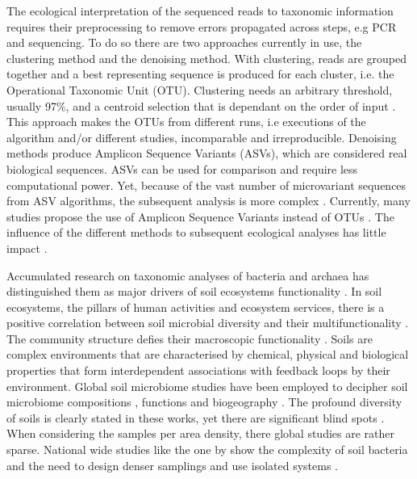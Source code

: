 The ecological interpretation of the sequenced reads to taxonomic information
requires their preprocessing to remove errors propagated across steps, e.g PCR and sequencing.
To do so there are two approaches currently in use, 
the clustering method and the denoising method. With clustering, reads are 
grouped together and a best representing sequence is produced for each 
cluster, i.e. the Operational Taxonomic Unit (OTU). 
Clustering needs an arbitrary threshold, usually 97\%, and a centroid selection
that is dependant on the order of input \parencite{zafeiropoulos2020pema}. 
This approach makes the OTUs 
from different runs, i.e executions of the algorithm and/or different studies,
incomparable and irreproducible.
Denoising methods produce Amplicon Sequence Variants (ASVs),
which are considered real biological sequences. 
ASVs can be used for comparison and require less computational power. 
Yet, because of the vast number of microvariant sequences from ASV algorithms,
the subsequent analysis is more complex \parencite{Glassman2018}.
Currently, many studies propose the use of Amplicon Sequence Variants
instead of OTUs \parencite{Callahan2017}.
The influence of the different methods to subsequent ecological analyses has
little impact \parencite{Glassman2018}.

Accumulated research on taxonomic analyses of bacteria and archaea has
distinguished them as major drivers of soil ecosystems functionality \parencite{Delgado-Baquerizo-atlas}.
In soil ecosystems, the pillars of human activities and ecosystem services, 
there is a positive correlation between soil microbial diversity and their multifunctionality \parencite{Delgado-Baquerizo2020}.
The community structure defies their macroscopic functionality \parencite{Bahram2018}.
Soils are complex environments that are characterised by chemical, physical and biological properties
that form interdependent associations with feedback loops by their environment. 
Global soil microbiome studies have been employed to decipher soil microbiome
compositions \parencite{thompson2017a-communal, Delgado-Baquerizo-atlas, Labouyrie2023},
functions \parencite{Bahram2018} and biogeography \parencite{Martiny2006, guerra2020Blind}.
The profound diversity of soils is clearly stated in these works, yet there are
significant blind spots \parencite{guerra2020Blind}.
When considering the samples per area density, there global studies are rather sparse.
National wide studies like the one by \textcite{Karimi2020} show the
complexity of soil bacteria and the need to design 
denser samplings and use isolated systems \parencite{Dini-Andreote2021}.


